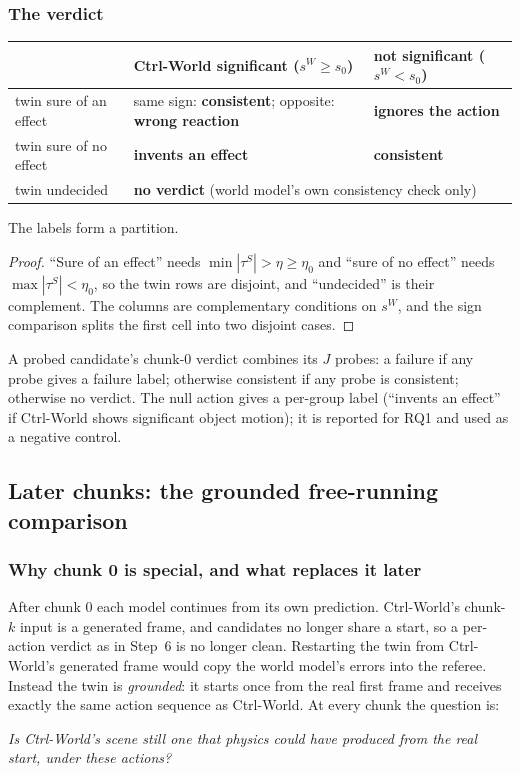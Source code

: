 \subsubsection{The verdict}
\begin{center}\small
\begin{tabular}{@{}lll@{}}
\toprule
 & Ctrl-World significant ($s^W\ge s_0$) & not significant ($s^W<s_0$)\\
\midrule
twin sure of an effect & same sign: \textbf{consistent}; opposite: \textbf{wrong reaction} & \textbf{ignores the action}\\
twin sure of no effect & \textbf{invents an effect} & \textbf{consistent}\\
twin undecided & \multicolumn{2}{l}{\textbf{no verdict} (world model's own consistency check only)}\\
\bottomrule
\end{tabular}
\end{center}
\begin{proposition}\label{method:prop:partition}
The labels form a partition.
\end{proposition}
\begin{proof}
``Sure of an effect'' needs $\min|\tau^S|>\eta\ge\eta_0$ and ``sure of no effect'' needs $\max|\tau^S|<\eta_0$, so the twin rows are disjoint, and ``undecided'' is their complement. The columns are complementary conditions on $s^W$, and the sign comparison splits the first cell into two disjoint cases.
\end{proof}
A probed candidate's chunk-0 verdict combines its $J$ probes: a failure if any probe gives a failure label; otherwise consistent if any probe is consistent; otherwise no verdict. The null action gives a per-group label (``invents an effect'' if Ctrl-World shows significant object motion); it is reported for RQ1 and used as a negative control.

\subsection{Later chunks: the grounded free-running comparison}\label{method:sec:grounded}

\subsubsection{Why chunk 0 is special, and what replaces it later}
After chunk 0 each model continues from its own prediction. Ctrl-World's chunk-$k$ input is a generated frame, and candidates no longer share a start, so a per-action verdict as in Step~6 is no longer clean. Restarting the twin from Ctrl-World's generated frame would copy the world model's errors into the referee. Instead the twin is \emph{grounded}: it starts once from the real first frame and receives exactly the same action sequence as Ctrl-World. At every chunk the question is:
\begin{center}
\emph{Is Ctrl-World's scene still one that physics could have produced from the real start, under these actions?}
\end{center}

